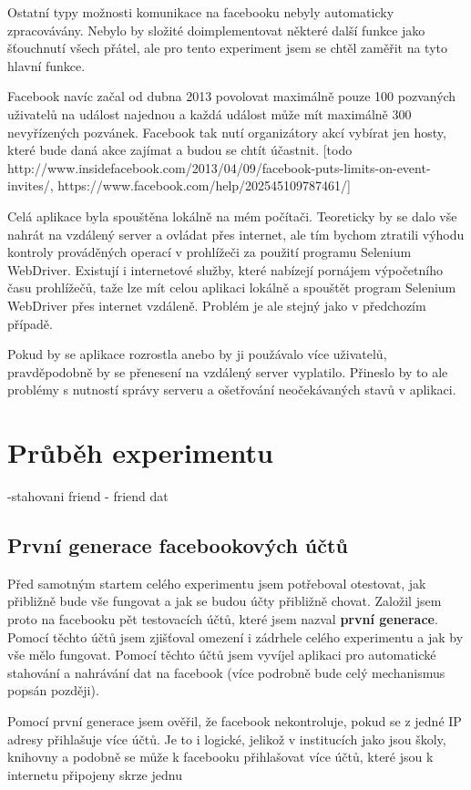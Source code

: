 \documentclass[thesis=M,czech]{FITthesis}[2013/05/10]
\begin{document}
Ostatní typy možnosti komunikace na facebooku nebyly automaticky zpracovávány. Nebylo by složité doimplementovat některé další funkce jako šťouchnutí všech přátel, ale pro tento experiment jsem se chtěl zaměřit na tyto hlavní funkce. 

Facebook navíc začal od dubna 2013 povolovat maximálně pouze 100 pozvaných uživatelů na událost najednou a každá událost může mít maximálně 300 nevyřízených pozvánek. Facebook tak nutí organizátory akcí vybírat jen hosty, které bude daná akce zajímat a budou se chtít účastnit.
[todo http://www.insidefacebook.com/2013/04/09/facebook-puts-limits-on-event-invites/, https://www.facebook.com/help/202545109787461/]

Celá aplikace byla spouštěna lokálně na mém počítači. Teoreticky by se dalo vše nahrát na vzdálený server a ovládat přes internet, ale tím bychom ztratili výhodu kontroly prováděných operací v prohlížeči za použití programu Selenium WebDriver. Existují i internetové služby, které nabízejí pornájem výpočetního času prohlížečů, taže lze mít celou aplikaci lokálně a spouštět program Selenium WebDriver přes internet vzdáleně. Problém je ale stejný jako v předchozím případě.

Pokud by se aplikace rozrostla anebo by ji použávalo více uživatelů, pravděpodobně by se přenesení na vzdálený server vyplatilo. Přineslo by to ale problémy s nutností správy serveru a ošetřování neočekávaných stavů v aplikaci.




\chapter{Průběh experimentu}

-stahovani friend - friend dat
\section{První generace facebookových účtů}

Před samotným startem celého experimentu jsem potřeboval otestovat, jak přibližně bude vše fungovat a jak se budou účty přibližně chovat. Založil jsem proto na facebooku pět testovacích účtů, které jsem nazval \textbf{první generace}. Pomocí těchto účtů jsem zjišťoval omezení i zádrhele celého experimentu a jak by vše mělo fungovat. Pomocí těchto účtů jsem vyvíjel aplikaci pro automatické stahování a nahrávání dat na facebook (více podrobně bude celý mechanismus popsán později).

Pomocí první generace jsem ověřil, že facebook nekontroluje, pokud se z jedné IP adresy přihlašuje více účtů. Je to i logické, jelikož v institucích jako jsou školy, knihovny a podobně se může k facebooku přihlašovat více účtů, které jsou k internetu připojeny skrze jednu
\end{document}
